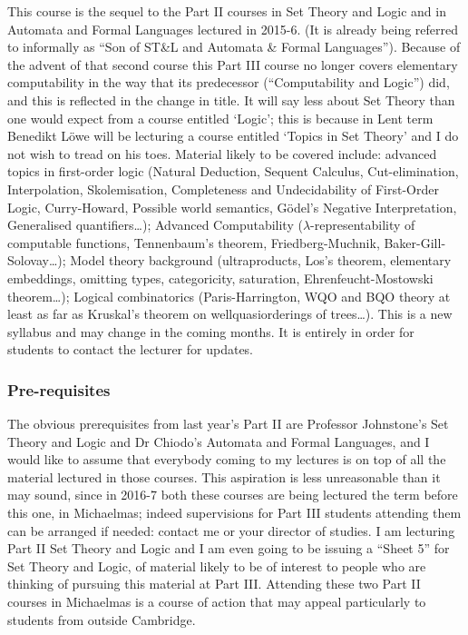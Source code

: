 \documentclass[a4paper]{article}
\begin{document}
\maketitle
{\small
\setlength{\parindent}{0em}
\setlength{\parskip}{1em}
This course is the sequel to the Part II courses in Set Theory and Logic and in Automata and Formal Languages lectured in 2015-6. (It is already being referred to informally as ``Son of ST\&L and Automata \& Formal Languages''). Because of the advent of that second course this Part III course no longer covers elementary computability in the way that its predecessor (``Computability and Logic'') did, and this is reflected in the change in title. It will say less about Set Theory than one would expect from a course entitled `Logic'; this is because in Lent term Benedikt L\"owe will be lecturing a course entitled `Topics in Set Theory' and I do not wish to tread on his toes. Material likely to be covered include: advanced topics in first-order logic (Natural Deduction, Sequent Calculus, Cut-elimination, Interpolation, Skolemisation, Completeness and Undecidability of First-Order Logic, Curry-Howard, Possible world semantics, G\"odel's Negative Interpretation, Generalised quantifiers\ldots); Advanced Computability ($\lambda$-representability of computable functions, Tennenbaum's theorem, Friedberg-Muchnik, Baker-Gill-Solovay\ldots); Model theory background (ultraproducts, Los's theorem, elementary embeddings, omitting types, categoricity, saturation, Ehrenfeucht-Mostowski theorem\ldots); Logical combinatorics (Paris-Harrington, WQO and BQO theory at least as far as Kruskal's theorem on wellquasiorderings of trees\ldots). This is a new syllabus and may change in the coming months. It is entirely in order for students to contact the lecturer for updates.

\subsubsection*{Pre-requisites}
The obvious prerequisites from last year's Part II are Professor Johnstone's Set Theory and Logic and Dr Chiodo's Automata and Formal Languages, and I would like to assume that everybody coming to my lectures is on top of all the material lectured in those courses. This aspiration is less unreasonable than it may sound, since in 2016-7 both these courses are being lectured the term before this one, in Michaelmas; indeed supervisions for Part III students attending them can be arranged if needed: contact me or your director of studies. I am lecturing Part II Set Theory and Logic and I am even going to be issuing a ``Sheet 5'' for Set Theory and Logic, of material likely to be of interest to people who are thinking of pursuing this material at Part III. Attending these two Part II courses in Michaelmas is a course of action that may appeal particularly to students from outside Cambridge.
}
\tableofcontents
\end{document}
